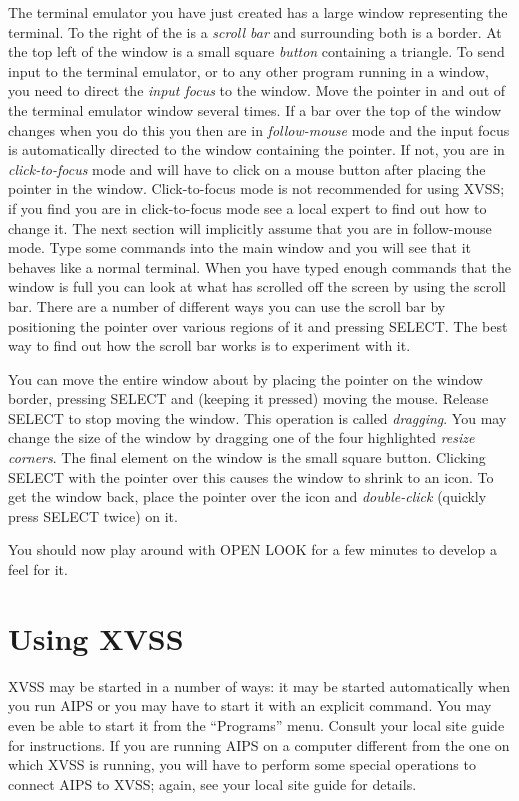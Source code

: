 The terminal emulator you have just created has a large window
representing the terminal. To the right of the is a {\em scroll bar}
and surrounding both is a border. At the top left of the window is a
small square {\em button} containing a triangle. To send input to the
terminal emulator, or to any other program running in a window, you
need to direct the {\em input focus} to the window. Move the pointer
in and out of the terminal emulator window several times. If a bar
over the top of the window changes when you do this you then are in {\em
follow-mouse} mode and the input focus is automatically directed to
the window containing the pointer. If not, you are in {\em
click-to-focus} mode and will have to click on a mouse button after
placing the pointer in the window. Click-to-focus mode is not
recommended for using XVSS; if you find you are in click-to-focus mode
see a local expert to find out how to change it. The next section will
implicitly assume that you are in follow-mouse mode. Type some commands
into the main window and you will see that it behaves like a normal
terminal. When you have typed enough commands that the window is full
you can look at what has scrolled off the screen by using the scroll
bar. There are a number of different ways you can use the scroll bar
by positioning the pointer over various regions of it and pressing
SELECT. The best way to find out how the scroll bar works is to
experiment with it.

You can move the entire window about by placing the pointer on the
window border, pressing SELECT and (keeping it pressed) moving the
mouse. Release SELECT to stop moving the window. This operation is
called {\em dragging}. You may change the size of the window by
dragging one of the four highlighted {\em resize corners}. The final
element on the window is the small square button. Clicking SELECT with
the pointer over this causes the window to shrink to an icon. To get
the window back, place the pointer over the icon and {\em
double-click} (quickly press SELECT twice) on it.

You should now play around with OPEN LOOK for a few minutes to develop
a feel for it.

\section{Using XVSS}

XVSS may be started in a number of ways: it may be started
automatically when you run AIPS or you may have to start it with an
explicit command. You may even be able to start it from the
``Programs'' menu. Consult your local site guide for instructions. If
you are running AIPS on a computer different from the one on which
XVSS is running, you will have to perform some special operations to
connect AIPS to XVSS; again, see your local site guide for details.

